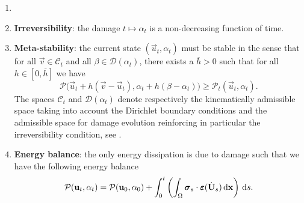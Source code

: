 \begin{definition} \label{def:qsgraddama}
\begin{enumerate}
\item[]
\item \textbf{Irreversibility}: the damage $t\mapsto\alpha_t$ is a non-decreasing function of time.

\item \textbf{Meta-stability}: the current state $(\vec{u}_t,\alpha_t)$ must be stable in the sense that for all $\vec{v}\in\mathcal{C}_t$ and all $\beta\in\mathcal{D}(\alpha_t)$, there exists a $\overline{h}>0$ such that for all $h\in[0,\overline{h}]$ we have
\begin{equation} \label{eq:qsstability}
\mathcal{P}\bigl(\vec{u}_t+h(\vec{v}-\vec{u}_t),\alpha_t+h(\beta-\alpha_t)\bigr)\geq\mathcal{P}_t(\vec{u}_t,\alpha_t).
\end{equation}
The spaces $\mathcal{C}_t$ and $\mathcal{D}(\alpha_t)$ denote respectively the kinematically admissible space taking into account the Dirichlet boundary conditions and the admissible space for damage evolution reinforcing in particular the irreversibility condition, see \cite{PhamAmorMarigoMaurini:2011}.

\item \textbf{Energy balance}: the only energy dissipation is due to damage such that we have the following energy balance
\begin{equation} \label{eq:qseb}
\mathcal{P}(\vec{u}_t,\alpha_t)=\mathcal{P}(\vec{u}_0,\alpha_0)+\int_0^t\left(\int_\Omega\sig_s\cdot\eps(\dot{\vec{U}}_s)\dx\right)\D{s}.
\end{equation}
\end{enumerate}
\end{definition}

